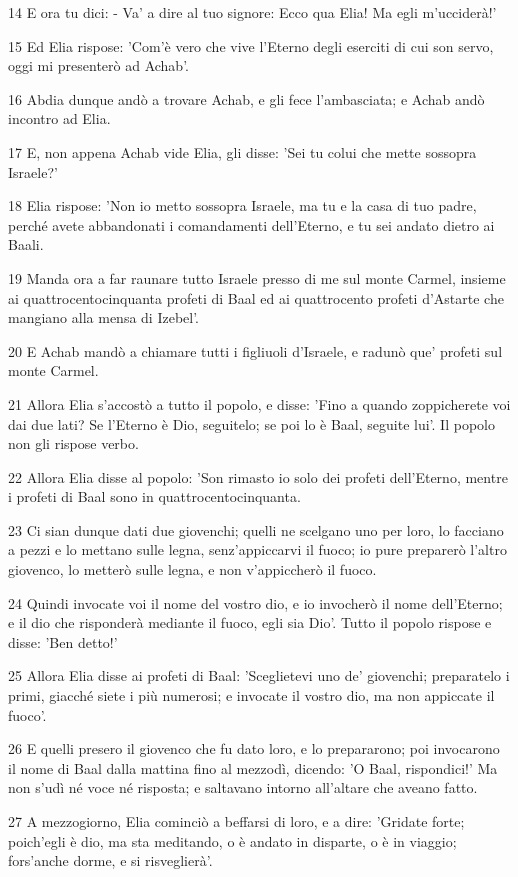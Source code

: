 \par 14 E ora tu dici: - Va' a dire al tuo signore: Ecco qua Elia! Ma egli m'ucciderà!'
\par 15 Ed Elia rispose: 'Com'è vero che vive l'Eterno degli eserciti di cui son servo, oggi mi presenterò ad Achab'.
\par 16 Abdia dunque andò a trovare Achab, e gli fece l'ambasciata; e Achab andò incontro ad Elia.
\par 17 E, non appena Achab vide Elia, gli disse: 'Sei tu colui che mette sossopra Israele?'
\par 18 Elia rispose: 'Non io metto sossopra Israele, ma tu e la casa di tuo padre, perché avete abbandonati i comandamenti dell'Eterno, e tu sei andato dietro ai Baali.
\par 19 Manda ora a far raunare tutto Israele presso di me sul monte Carmel, insieme ai quattrocentocinquanta profeti di Baal ed ai quattrocento profeti d'Astarte che mangiano alla mensa di Izebel'.
\par 20 E Achab mandò a chiamare tutti i figliuoli d'Israele, e radunò que' profeti sul monte Carmel.
\par 21 Allora Elia s'accostò a tutto il popolo, e disse: 'Fino a quando zoppicherete voi dai due lati? Se l'Eterno è Dio, seguitelo; se poi lo è Baal, seguite lui'. Il popolo non gli rispose verbo.
\par 22 Allora Elia disse al popolo: 'Son rimasto io solo dei profeti dell'Eterno, mentre i profeti di Baal sono in quattrocentocinquanta.
\par 23 Ci sian dunque dati due giovenchi; quelli ne scelgano uno per loro, lo facciano a pezzi e lo mettano sulle legna, senz'appiccarvi il fuoco; io pure preparerò l'altro giovenco, lo metterò sulle legna, e non v'appiccherò il fuoco.
\par 24 Quindi invocate voi il nome del vostro dio, e io invocherò il nome dell'Eterno; e il dio che risponderà mediante il fuoco, egli sia Dio'. Tutto il popolo rispose e disse: 'Ben detto!'
\par 25 Allora Elia disse ai profeti di Baal: 'Sceglietevi uno de' giovenchi; preparatelo i primi, giacché siete i più numerosi; e invocate il vostro dio, ma non appiccate il fuoco'.
\par 26 E quelli presero il giovenco che fu dato loro, e lo prepararono; poi invocarono il nome di Baal dalla mattina fino al mezzodì, dicendo: 'O Baal, rispondici!' Ma non s'udì né voce né risposta; e saltavano intorno all'altare che aveano fatto.
\par 27 A mezzogiorno, Elia cominciò a beffarsi di loro, e a dire: 'Gridate forte; poich'egli è dio, ma sta meditando, o è andato in disparte, o è in viaggio; fors'anche dorme, e si risveglierà'.
